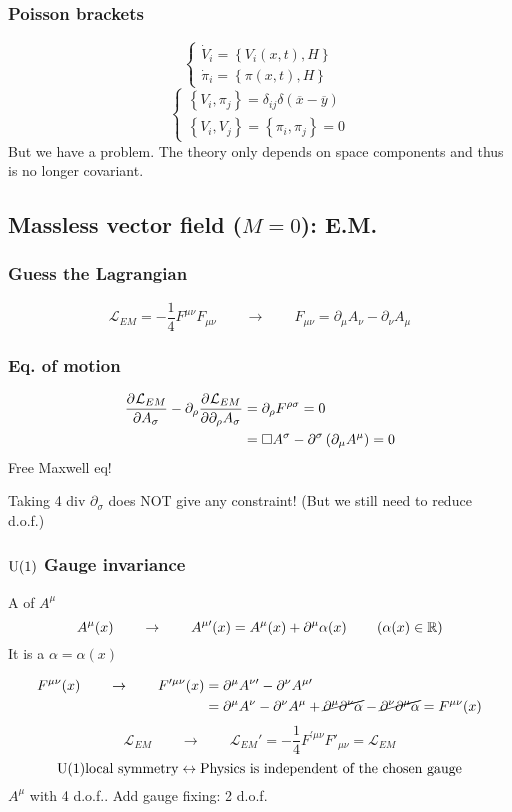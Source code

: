 \subsubsection{Poisson brackets}
\[ \begin{cases}
\dot{V}_i = \left\{V_i(x,t), H\right\} \\
\dot{\pi}_i = \left\{\pi(x,t), H\right\}
\end{cases} \]
\[ \begin{cases}
\left\{V_i,\pi_j\right\} = \delta_{ij}\delta(\overline{x}- \overline{y}) \\
\left\{V_i,V_j\right\} = \left\{\pi_i,\pi_j\right\} = 0
\end{cases} \]
But we have a problem. The theory only depends on space components and thus is no longer covariant.

\subsection{Massless vector field ($M=0$): E.M.}
\subsubsection{Guess the Lagrangian}
\[ \mathcal{L}_{EM} = - \frac{1}{4}F^{\mu\nu}F_{\mu\nu} \qquad \to \qquad F_{\mu\nu}=\partial_\mu A_\nu - \partial_\nu A_\mu \]
\subsubsection{Eq. of motion}
\begin{align*}
 \frac{\partial{^{}}\mathcal{L}_{EM}}{\partial{{A_\sigma}^{}}}  - \partial_\rho  \frac{\partial{^{}}\mathcal{L}_{EM}}{\partial{{\partial_\rho A_\sigma}^{}}}  &= \partial_\rho F^{\rho\sigma} = 0 \\
&= \Box A^\sigma - \partial^\sigma \left(\partial_\mu A^\mu\right) = 0
\end{align*}
Free Maxwell eq!

Taking 4 div $\partial_\sigma$ does NOT give any constraint! (But we still need to reduce d.o.f.)

\subsubsection{$\operatorname{U}(1)$ Gauge invariance}
\begin{definition}
A  of $A^\mu$
\[ A^\mu(x) \qquad \to \qquad A^{\mu\prime}(x) = A^\mu(x) + \partial^\mu\alpha(x) \qquad \left(\alpha(x) \in \mathbb{R}\right) \]
It is a  $\alpha = \alpha(x)$
\end{definition}
\begin{align*}
F^{\mu\nu}(x) \qquad \to \qquad F^{\prime\mu\nu}(x) &= \partial^\mu A^{\nu\prime} - \partial^\nu A^{\mu\prime} \\
&= \partial^\mu A^\nu - \partial^\nu A^\mu + \cancel{\partial^\mu\partial^\nu\alpha} - \cancel{\partial^\nu\partial^\mu\alpha} = F^{\mu\nu}(x)
\end{align*}
\[ \mathcal{L}_{EM} \qquad \to \qquad \mathcal{L}_{EM}' = - \frac{1}{4}F^{\prime\mu\nu}F'_{\mu\nu} = \mathcal{L}_{EM} \]
\[ \operatorname{U}(1) \text{local symmetry} \leftrightarrow \text{Physics is independent of the chosen gauge} \]
$A^\mu$ with 4 d.o.f.. Add gauge fixing: 2 d.o.f.

